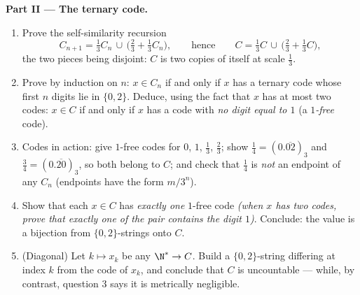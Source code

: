 \begin{problem}[{Weekend problem --- the Cantor middle-thirds
\omterm{def:b1:logic:sets}{set}: length zero, uncountable, perfect, and $C + C =
\intcc{0}{2}$}]
\medskip
\noindent\textbf{Part II --- The ternary code.}
\begin{enumerate}[resume]
  \item Prove the self-similarity recursion
        \[
        C_{n+1} = \tfrac13 C_n \,\cup\,
        \bigl(\tfrac23 + \tfrac13 C_n\bigr),
        \qquad\text{hence}\qquad
        C = \tfrac13 C \,\cup\, \bigl(\tfrac23 + \tfrac13
        C\bigr),
        \]
        the two pieces being disjoint: $C$ is two copies of
        itself at scale $\frac13$.
  \item Prove by induction on $n$: $x \in C_n$ if and only if
        $x$ has a ternary code whose first $n$ digits lie in
        $\{0, 2\}$. Deduce, using the fact that $x$ has at most
        two codes: $x \in C$ if and only if $x$ has a code with
        \emph{no digit equal to $1$} (a \emph{$1$-free} code).
  \item Codes in action: give $1$-free codes for $0$, $1$,
        $\frac13$, $\frac23$; show $\frac14 = (0.\overline{02})_3$
        and $\frac34 = (0.\overline{20})_3$, so both belong to
        $C$; and check that $\frac14$ is \emph{not} an endpoint
        of any $C_n$ (endpoints have the form $m/3^n$).
  \item Show that each $x \in C$ has \emph{exactly one} $1$-free
        code \emph{(when $x$ has two codes, prove that exactly
        one of the pair contains the digit $1$)}. Conclude: the
        value  is a bijection from $\{0,2\}$-strings onto
        $C$.
  \item (Diagonal) Let $k \mapsto x_k$ be any  $\N^* \to C$.
        Build a $\{0, 2\}$-string differing at index $k$ from
        the code of $x_k$, and conclude that $C$ is uncountable
        --- while, by contrast, question 3 says it is
        metrically negligible.
\end{enumerate}


\end{problem}

